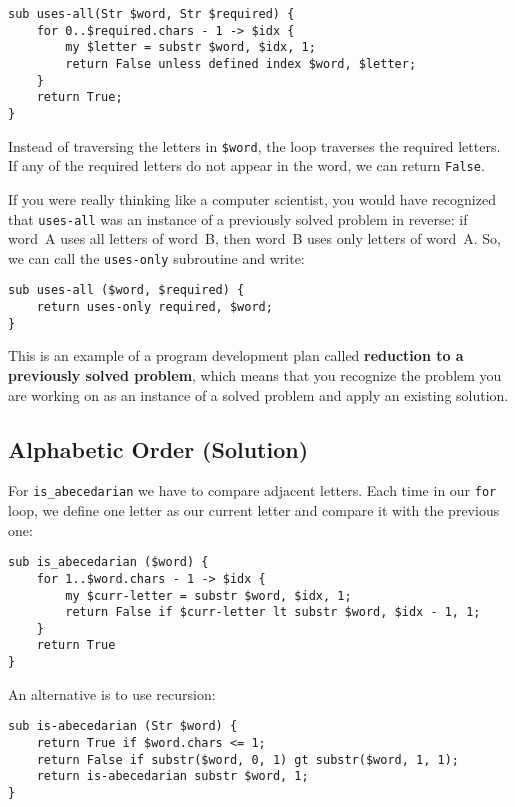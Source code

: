 \begin{verbatim}
sub uses-all(Str $word, Str $required) {
    for 0..$required.chars - 1 -> $idx {
        my $letter = substr $word, $idx, 1;
        return False unless defined index $word, $letter;
    }
    return True;
}
\end{verbatim}
%
Instead of traversing the letters in {\tt \$word}, the loop
traverses the required letters.  If any of the required letters
do not appear in the word, we can return {\tt False}.

If you were really thinking like a computer scientist, you would
have recognized that \verb"uses-all" was an instance of a
previously solved problem in reverse: if word~A uses all 
letters of word~B, then word~B uses only letters of word~A. So, 
we can call the {\tt uses-only} subroutine and write:

\begin{verbatim}
sub uses-all ($word, $required) {
    return uses-only required, $word;
}
\end{verbatim}
%
This is an example of a program development plan called 
{\bf reduction to a previously solved problem}, which means that you
recognize the problem you are working on as an instance of a solved
problem and apply an existing solution. 

\subsection{Alphabetic Order (Solution)}

For \verb"is_abecedarian" we have to compare adjacent letters. 
Each time in our {\tt for} loop, we define one letter as our 
current letter and compare it with the previous one:

\begin{verbatim}
sub is_abecedarian ($word) {
    for 1..$word.chars - 1 -> $idx {    
        my $curr-letter = substr $word, $idx, 1;
        return False if $curr-letter lt substr $word, $idx - 1, 1;  
    }     
    return True
}
\end{verbatim}

An alternative is to use recursion:

\begin{verbatim}
sub is-abecedarian (Str $word) {
    return True if $word.chars <= 1;
    return False if substr($word, 0, 1) gt substr($word, 1, 1);
    return is-abecedarian substr $word, 1;
}
\end{verbatim}

